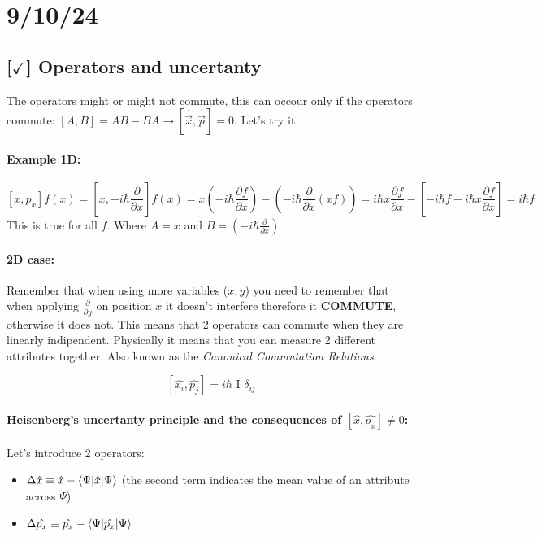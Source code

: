 \section{9/10/24}

\subsection{[$\checkmark$] Operators and uncertanty}

The operators might or might not commute, this can occour only if the operators commute: $[A, B] = AB - BA \rightarrow [\hat{\vec{x}}, \hat{\vec{p}}] = 0$. Let's try it.

\paragraph{Example 1D: } $$\left[x, p_x\right]f(x) = \left[x, -i\hbar \frac{\partial}{\partial x}\right]f(x) = x\left(-i\hbar \frac{\partial f}{\partial x}\right) - \left(-i\hbar \frac{\partial}{\partial x} (xf)\right) = i\hbar x \frac{\partial f}{\partial x} - \left[- i\hbar f-i\hbar x\frac{\partial f}{\partial x}\right] = i\hbar f$$
%
This is true for all $f$. Where $A = x$ and $B = \left(-i\hbar \frac{\partial}{\partial x}\right)$

\paragraph{2D case:} Remember that when using more variables ($x, y$) you need to remember that when applying $\frac{\partial}{\partial y}$ on position $x$ it doesn't interfere therefore it \textbf{COMMUTE}, otherwise it does not. This means that 2 operators can commute when they are linearly indipendent. Physically it means that you can measure 2 different attributes together. Also known as the \textit{Canonical Commutation Relations}:

$$[\hat{x_i}, \hat{p_j}] = i\hbar \text{ I } \delta_{ij}$$

\paragraph{Heisenberg's uncertanty principle and the consequences of $[\hat{x}, \hat{p_x}] \neq 0$: } Let's introduce 2 operators:

\begin{itemize}
    \item $\Delta\hat{x} \equiv \hat{x} - \braket{\Psi | \hat{x} | \Psi}$ (the second term indicates the mean value of an attribute across $\Psi$)
    \item $\Delta\hat{p_x} \equiv \hat{p_x} - \braket{\Psi | \hat{p_x} | \Psi}$
\end{itemize}

